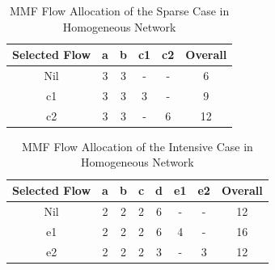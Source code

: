 \documentclass[10pt,journal,compsoc]{IEEEtran}
\begin{document}
\begin{table}[!t]
\renewcommand{\arraystretch}{1}
\caption{MMF Flow Allocation of the Sparse Case in Homogeneous Network}
\label{table:homoSparse}
\centering
\begin{tabularx}{.35\textwidth}{c||c|c|c|c|c}
\hline
\textbf{Selected Flow} & \textbf{a} & \textbf{b} & \textbf{c1} & \textbf{c2} & \textbf{Overall}\\
\hline
Nil &3&3&-&-&6\\
\hline
c1 &3&3&3&-&9\\
\hline
c2 &3&3&-&6&12\\
\hline
\end{tabularx}
\end{table}

\begin{table}[!t]
\renewcommand{\arraystretch}{1}
\caption{MMF Flow Allocation of the Intensive Case in Homogeneous Network}
\label{table:homoIntensive}
\centering
\begin{tabularx}{.42\textwidth}{c||c|c|c|c|c|c|c}
\hline
\textbf{Selected Flow} & \textbf{a} & \textbf{b} & \textbf{c} & \textbf{d} & \textbf{e1} &\textbf{e2} &\textbf{Overall}\\
\hline
Nil &2&2&2&6&-&-&12\\
\hline
e1 &2&2&2&6&4&-&16\\
\hline
e2 &2&2&2&3&-&3&12\\
\hline
\end{tabularx}
\end{table}
\end{document}
